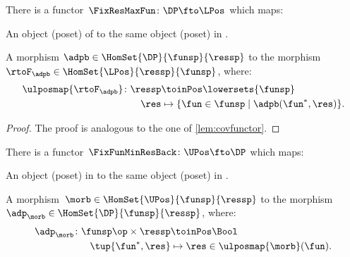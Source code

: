 \begin{lemma}
\label{lem:confunctor}
There is a functor~$\FixResMaxFun\colon \DP \fto \LPos$ which maps:
\begin{compactenum}
\item An object (poset) of \DP to the same object (poset) in \LPos.
\item A morphism $\adpb \in \HomSet{\DP}{\funsp}{\ressp}$ to the morphism~$\rtoF_\adpb\in \HomSet{\LPos}{\ressp}{\funsp}$, where:
\begin{equation*}
    \begin{aligned}
    \ulposmap{\rtoF_\adpb}\colon \ressp &\toinPos \lowersets{\funsp}\\
    \res&\mapsto \{ \fun \in \funsp \mid \adpb(\fun^*,\res)\}.
    \end{aligned}
\end{equation*}
\end{compactenum}
\end{lemma}

\begin{proof}
    The proof is analogous to the one of \cref{lem:covfunctor}.
\end{proof}


\begin{lemma}
\label{lem:covfunctorback}
There is a functor~$\FixFunMinResBack\colon \UPos \fto \DP$ which maps:
\begin{compactenum}
\item An object (poset) in \UPos to the same object (poset) in \DP.
\item A morphism~$\morb\in \HomSet{\UPos}{\funsp}{\ressp}$ to the morphism~$\adp_\morb \in \HomSet{\DP}{\funsp}{\ressp}$, where:
\begin{equation}
\begin{aligned}
    \adp_\morb\colon \funsp\op \times \ressp &\toinPos \Bool\\
    \tup{\fun^*,\res}&\mapsto \res \in \ulposmap{\morb}(\fun).
\end{aligned}
\end{equation}
\end{compactenum}
\end{lemma}

